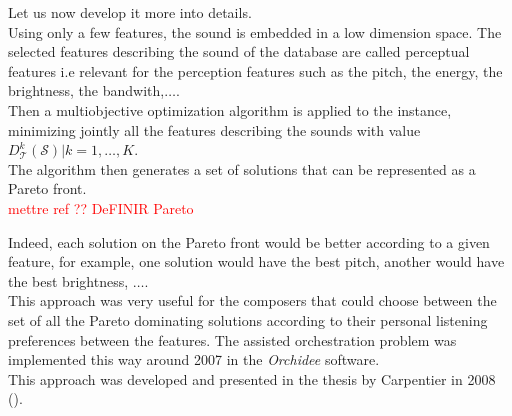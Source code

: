 \documentclass[a4paper]{book}
\newcommand{\alex}[2]{\textcolor{red}{#1}}
\begin{document}
Let us now develop it more into details.\\
Using only a few features, the sound is embedded in a low dimension space. The selected features describing the sound of the database are called perceptual features i.e relevant for the perception features such as the pitch, the energy, the brightness, the bandwith,$\ldots$. \\

Then a multiobjective optimization algorithm is applied to the instance, minimizing jointly all the features describing the sounds with value $D^k_\mathcal{T}(\mathcal{S}) | k=1,\ldots,K$.\\
The algorithm then generates a set of solutions that can be represented as a Pareto front.\\
\alex{mettre ref ?? DeFINIR Pareto} \\

Indeed, each solution on the Pareto front would be better according to a given feature, for example, one solution would have the best pitch, another would have the best brightness, $\ldots$.\\
This approach was very useful for the composers that could choose between the set of all the Pareto dominating solutions according to their personal listening preferences between the features. The assisted orchestration problem was implemented this way around 2007 in the \textit{Orchidee} software.\\
This approach was developed and presented in the thesis by Carpentier in 2008 (\cite{carpentier2008approche}).\\
\end{document}
